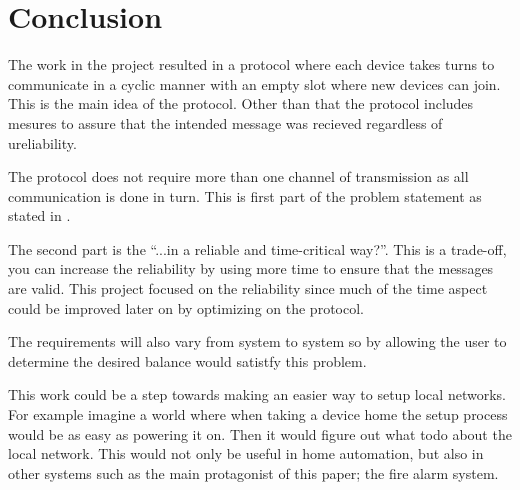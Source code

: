 \chapter{Conclusion}\label{cha:conclusion}

The work in the project resulted in a protocol where each device takes turns to communicate in a cyclic manner with an empty slot where new devices can join.
This is the main idea of the protocol.
Other than that the protocol includes mesures to assure that the intended message was recieved regardless of ureliability.

The protocol does not require more than one channel of transmission as all communication is done in turn.
This is first part of the problem statement as stated in .

The second part is the \enquote{...in a reliable and time-critical way?}.
This is a trade-off, you can increase the reliability by using more time to ensure that the messages are valid.
This project focused on the reliability since much of the time aspect could be improved later on by optimizing on the protocol.

The requirements will also vary from system to system so by allowing the user to determine the desired balance would satistfy this problem.

This work could be a step towards making an easier way to setup local networks.
For example imagine a world where when taking a device home the setup process would be as easy as powering it on.
Then it would figure out what todo about the local network.
This would not only be useful in home automation, but also in other systems such as the main protagonist of this paper; the fire alarm system.

